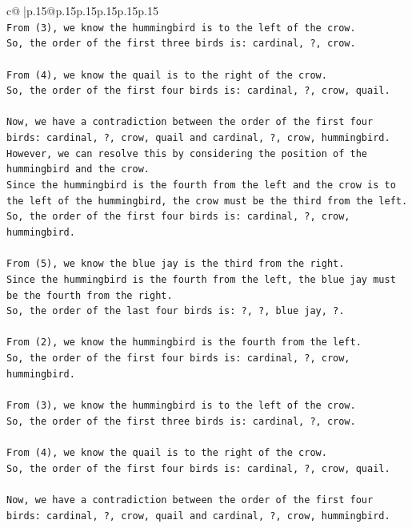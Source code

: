 \documentclass{article}
\begin{document}
{\begin{supertabular}{c@{$\;$}|p{.15\linewidth}@{}p{.15\linewidth}p{.15\linewidth}p{.15\linewidth}p{.15\linewidth}p{.15\linewidth}}
{{{\\ 
\texttt{From (3), we know the hummingbird is to the left of the crow. } \\
\texttt{So, the order of the first three birds is: cardinal, ?, crow.} \\
\\ 
\texttt{From (4), we know the quail is to the right of the crow. } \\
\texttt{So, the order of the first four birds is: cardinal, ?, crow, quail.} \\
\\ 
\texttt{Now, we have a contradiction between the order of the first four birds: cardinal, ?, crow, quail and cardinal, ?, crow, hummingbird. } \\
\texttt{However, we can resolve this by considering the position of the hummingbird and the crow. } \\
\texttt{Since the hummingbird is the fourth from the left and the crow is to the left of the hummingbird, the crow must be the third from the left. } \\
\texttt{So, the order of the first four birds is: cardinal, ?, crow, hummingbird.} \\
\\ 
\texttt{From (5), we know the blue jay is the third from the right. } \\
\texttt{Since the hummingbird is the fourth from the left, the blue jay must be the fourth from the right. } \\
\texttt{So, the order of the last four birds is: ?, ?, blue jay, ?.} \\
\\ 
\texttt{From (2), we know the hummingbird is the fourth from the left. } \\
\texttt{So, the order of the first four birds is: cardinal, ?, crow, hummingbird.} \\
\\ 
\texttt{From (3), we know the hummingbird is to the left of the crow. } \\
\texttt{So, the order of the first three birds is: cardinal, ?, crow.} \\
\\ 
\texttt{From (4), we know the quail is to the right of the crow. } \\
\texttt{So, the order of the first four birds is: cardinal, ?, crow, quail.} \\
\\ 
\texttt{Now, we have a contradiction between the order of the first four birds: cardinal, ?, crow, quail and cardinal, ?, crow, hummingbird. } \\
}}}
\end{supertabular}}
\end{document}
